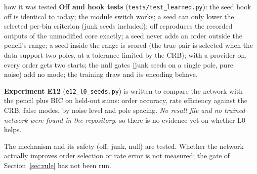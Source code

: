 \begin{explained}{how it was tested}
\textbf{Off and hook tests} (\texttt{tests/test\_learned.py}): the seed hook off is identical to today; the module switch works; a seed can only lower the selected per-bin criterion (junk seeds included); off reproduces the recorded outputs of the unmodified core exactly; a seed never adds an order outside the pencil's range; a seed inside the range is scored (the true pair is selected when the data support two poles, at a tolerance limited by the CRB); with a provider on, every order gets two starts; the null gates (junk seeds on a single pole, pure noise) add no mode; the training draw and its encoding behave.

\medskip\textbf{Experiment E12} (\texttt{e12\_l0\_seeds.py}) is written to compare the network with the pencil plus BIC on held-out sums: order accuracy, rate efficiency against the CRB, false modes, by noise level and pole spacing. \emph{No result file and no trained network were found in the repository}, so there is no evidence yet on whether L0 helps.
\end{explained}

\begin{caution}[title=Status of L0]
The mechanism and its safety (off, junk, null) are tested. Whether the network actually improves order selection or rate error is not measured; the gate of Section~\ref{sec:rule} has not been run.
\end{caution}

